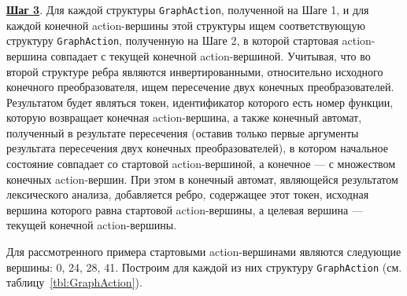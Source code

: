 \textbf{\underline{Шаг 3}}. Для каждой структуры \verb|GraphAction|, полученной на Шаге 1, и для каждой конечной  action-вершины этой структуры ищем соответствующую структуру \verb|GraphAction|, полученную на Шаге 2, в которой стартовая action-вершина совпадает с текущей конечной action-вершиной. Учитывая, что во второй структуре ребра являются инвертированными, относительно исходного конечного преобразователя, ищем пересечение двух конечных преобразователей. Результатом будет являться токен, идентификатор которого есть номер функции, которую возвращает конечная action-вершина, а также конечный автомат, полученный в результате пересечения (оставив только первые аргументы результата пересечения двух конечных преобразователей), в котором начальное состояние совпадает со стартовой action-вершиной, а конечное --- с множеством конечных action-вершин. При этом в конечный автомат, являющейся результатом лексического анализа, добавляется ребро, содержащее этот токен, исходная вершина которого равна стартовой action-вершины, а целевая вершина --- текущей конечной action-вершины. 

Для рассмотренного примера стартовыми action-вершинами являются следующие вершины: 0, 24, 28, 41. Построим для каждой из них структуру \verb|GraphAction| (см. таблицу~\ref{tbl:GraphAction}). 

